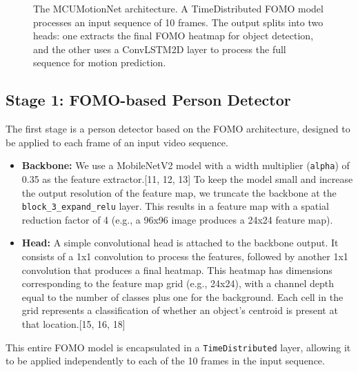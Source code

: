 \documentclass{article}
\begin{document}
\begin{figure}[h!]
{
}
\caption{The MCUMotionNet architecture.
A TimeDistributed FOMO model processes an input sequence of 10 frames.
The output splits into two heads: one extracts the final FOMO heatmap for object detection, and the other uses a ConvLSTM2D layer to process the full sequence for motion prediction.}
\label{fig:architecture}
\end{figure}

\subsection{Stage 1: FOMO-based Person Detector}
The first stage is a person detector based on the FOMO architecture, designed to be applied to each frame of an input video sequence.
\begin{itemize}
    \item \textbf{Backbone:} We use a MobileNetV2 model with a width multiplier (\texttt{alpha}) of 0.35 as the feature extractor.[11, 12, 13]
To keep the model small and increase the output resolution of the feature map, we truncate the backbone at the \texttt{block\_3\_expand\_relu} layer.
This results in a feature map with a spatial reduction factor of 4 (e.g., a 96x96 image produces a 24x24 feature map).
\item \textbf{Head:} A simple convolutional head is attached to the backbone output.
It consists of a 1x1 convolution to process the features, followed by another 1x1 convolution that produces a final heatmap.
This heatmap has dimensions corresponding to the feature map grid (e.g., 24x24), with a channel depth equal to the number of classes plus one for the background.
Each cell in the grid represents a classification of whether an object's centroid is present at that location.[15, 16, 18]
\end{itemize}
This entire FOMO model is encapsulated in a \texttt{TimeDistributed} layer, allowing it to be applied independently to each of the 10 frames in the input sequence.
\end{document}
